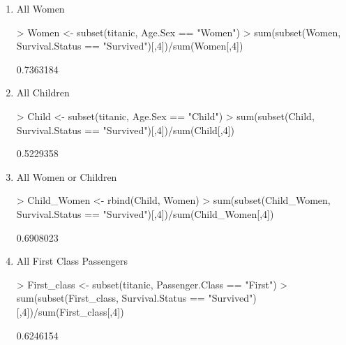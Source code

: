 \documentclass{article}
\begin{document}
\begin{enumerate}
\item All Women

\begin{Schunk}
\begin{Sinput}
> Women <- subset(titanic, Age.Sex == "Women")
> sum(subset(Women, Survival.Status == "Survived")[,4])/sum(Women[,4])
\end{Sinput}
\begin{Soutput}
[1] 0.7363184
\end{Soutput}
\end{Schunk}


\item All Children

\begin{Schunk}
\begin{Sinput}
> Child <- subset(titanic, Age.Sex == "Child")
> sum(subset(Child, Survival.Status == "Survived")[,4])/sum(Child[,4])
\end{Sinput}
\begin{Soutput}
[1] 0.5229358
\end{Soutput}
\end{Schunk}

\item All Women or Children

\begin{Schunk}
\begin{Sinput}
> Child_Women <- rbind(Child, Women)
> sum(subset(Child_Women, Survival.Status == "Survived")[,4])/sum(Child_Women[,4])
\end{Sinput}
\begin{Soutput}
[1] 0.6908023
\end{Soutput}
\end{Schunk}

\item All First Class Passengers

\begin{Schunk}
\begin{Sinput}
> First_class <- subset(titanic, Passenger.Class == "First")
> sum(subset(First_class, Survival.Status == "Survived")[,4])/sum(First_class[,4])
\end{Sinput}
\begin{Soutput}
[1] 0.6246154
\end{Soutput}
\end{Schunk}


\end{enumerate}
\end{document}
